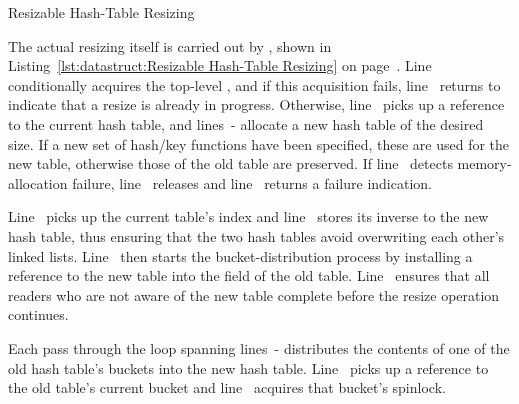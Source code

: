 \begin{listing*}[tb]

\caption{Resizable Hash-Table Resizing}
\label{lst:datastruct:Resizable Hash-Table Resizing}
\end{listing*}

\begin{lineref}
The actual resizing itself is carried out by , shown in
Listing~\ref{lst:datastruct:Resizable Hash-Table Resizing} on
page~\pageref{lst:datastruct:Resizable Hash-Table Resizing}.
Line~ conditionally acquires the top-level , and if
this acquisition fails, line~ returns  to indicate that
a resize is already in progress.
Otherwise, line~ picks up a reference to the current hash table,
and lines~- allocate a new hash table of the desired size.
If a new set of hash/key functions have been specified, these are
used for the new table, otherwise those of the old table are preserved.
If line~ detects memory-allocation failure,
line~ releases 
and line~ returns a failure indication.

Line~ picks up the current table's index and
line~ stores its inverse to
the new hash table, thus ensuring that the two hash tables avoid overwriting
each other's linked lists.
Line~ then starts the bucket-distribution process by
installing a reference to the new table into the  field of
the old table.
Line~ ensures that all readers who are not aware of the
new table complete before the resize operation continues.

Each pass through the loop spanning lines~- distributes the contents
of one of the old hash table's buckets into the new hash table.
Line~ picks up a reference to the old table's current bucket
and line~ acquires that bucket's spinlock.
\end{lineref}


